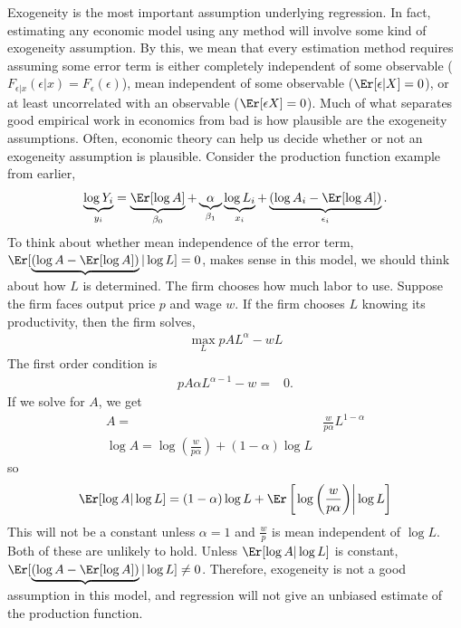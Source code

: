 Exogeneity is the most important assumption underlying regression. In
fact, estimating any economic model using any method will involve some
kind of exogeneity assumption. By this, we mean that every estimation
method requires assuming some error term is either completely
independent of some observable ($F_{\epsilon|x}(\epsilon|x) =
F_\epsilon(\epsilon)$), mean independent of some observable
($\Er[\epsilon|X] = 0$), or at least uncorrelated with an observable
($\Er[\epsilon X] = 0$). Much of what separates good empirical work in
economics from bad is how plausible are the exogeneity
assumptions. Often, economic theory can help us decide whether or
not an exogeneity assumption is plausible. Consider the 
production function example from earlier, 
\[ \underbrace{\log Y_i}_{y_i} = \underbrace{\Er[\log A]}_{\beta_0}
+ \underbrace{\alpha}_{\beta_1} \underbrace{\log L_i}_{x_i} +
\underbrace{(\log{A}_i - \Er[\log A])}_{\epsilon_i}. \]
To think about whether mean independence of the error term,
$\Er[\underbrace{(\log{A} - \Er[\log A])}|\log L]=0$, makes sense in
this model, we should think about how $L$ is determined. The firm
chooses how much labor to use. Suppose the firm faces output price $p$
and wage $w$. If the firm chooses $L$ knowing its productivity, then
the firm solves,
\begin{align*}
   \max_L p A L^\alpha - wL 
\end{align*}
The first order condition is 
\begin{align*}
  p A \alpha L^{\alpha -1} - w = & 0.
\end{align*}
If we solve for $A$, we get
\begin{align*}
  A = & \frac{w}{p \alpha } L^{1-\alpha} \\
  \log A = \log\left(\frac{w}{p \alpha }\right) + (1-\alpha) \log L
\end{align*}
so
\begin{align*}
  \Er[ \log A | \log L ] =  (1-\alpha) \log L +
  \Er\left[\left . \log\left(\frac{w}{p \alpha }\right) \right| \log L
  \right] 
\end{align*}
This will not be a constant unless $\alpha = 1$ and $\frac{w}{p}$ is
mean independent of $\log L$. Both of these are unlikely to
hold. Unless $\Er[ \log A | \log L ] $ is constant,
$\Er[\underbrace{(\log{A} - \Er[\log A])}|\log L] \neq 0$.  Therefore,
exogeneity is not a good assumption in this model, and regression will
not give an unbiased estimate of the production function. 

